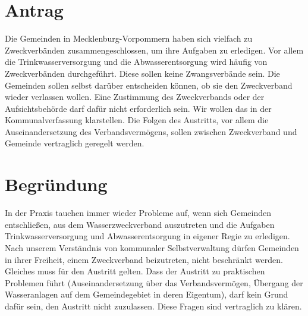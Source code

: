 \section{Antrag}

Die Gemeinden in Mecklenburg-Vorpommern haben sich vielfach zu Zweckverbänden zusammengeschlossen, um ihre Aufgaben zu erledigen. Vor allem die Trinkwasserversorgung und die Abwasserentsorgung wird häufig von Zweckverbänden durchgeführt. Diese sollen keine Zwangsverbände sein. Die Gemeinden sollen selbst darüber entscheiden können, ob sie den Zweckverband wieder verlassen wollen. Eine Zustimmung des Zweckverbands oder der Aufsichtsbehörde darf dafür nicht erforderlich sein. Wir wollen das in der Kommunalverfassung klarstellen. Die Folgen des Austritts, vor allem die Auseinandersetzung des Verbandsvermögens, sollen zwischen Zweckverband und Gemeinde vertraglich geregelt werden.

\section{Begründung}

In der Praxis tauchen immer wieder Probleme auf, wenn sich Gemeinden entschließen, aus dem Wasserzweckverband auszutreten und die Aufgaben Trinkwasserversorgung und Abwasserentsorgung in eigener Regie zu erledigen. Nach unserem Verständnis von kommunaler Selbstverwaltung dürfen Gemeinden in ihrer Freiheit, einem Zweckverband beizutreten, nicht beschränkt werden. Gleiches muss für den Austritt gelten. Dass der Austritt zu praktischen Problemen führt (Auseinandersetzung über das Verbandsvermögen, Übergang der Wasseranlagen auf dem Gemeindegebiet in deren Eigentum), darf kein Grund dafür sein, den Austritt nicht zuzulassen. Diese Fragen sind vertraglich zu klären.
